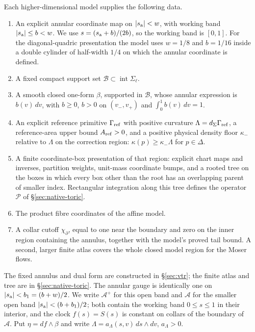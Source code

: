 \begin{definition}\label{def:hdl-handle-data}
Each higher-dimensional model supplies the following data.
\begin{enumerate}[label=(\alph*)]
\item An explicit annular coordinate map on $|s_{\rm a}|<w$, with working band
$|s_{\rm a}|\le b<w$. We use $s=(s_{\rm a}+b)/(2b)$, so the working band is $[0,1]$.
For the diagonal-quadric presentation the model uses $w=1/8$ and $b=1/16$ inside a double cylinder of half-width $1/4$ on which the annular coordinate is defined.
\item A fixed compact support set $\mathcal B\subset\operatorname{int}\Sigma_\ell$.
\item A smooth closed one-form $\beta$, supported in $\mathcal B$, whose annular expression is
$b(v)\,dv$, with $b\ge0$, $b>0$ on $(v_-,v_+)$ and $\int_0^1b(v)\,dv=1$.
\item An explicit reference primitive $\Gamma_{\rm ref}$ with positive curvature
$\Lambda=d_\Sigma\Gamma_{\rm ref}$, a reference-area upper bound $A_{\rm ref}>0$, and a positive
physical density floor $\kappa_-$ relative to $\Lambda$ on the correction region:
$\kappa(p)\ge\kappa_-\Lambda$ for $p\in\Delta$.
\item A finite coordinate-box presentation of that region: explicit chart maps and inverses,
partition weights, unit-mass coordinate bumps, and a rooted tree on the boxes in which every box other than the root has an overlapping parent of smaller index.
Rectangular integration along this tree defines the operator $\mathcal P$ of \S\ref{sec:native-toric}.
\item The product fibre coordinates of the affine model.
\item A collar cutoff $\chi_\partial$, equal to one near the boundary and zero on the inner region
containing the annulus, together with the model's proved tail bound. A second, larger finite atlas
covers the whole closed model region for the Moser flows.
\end{enumerate}
\end{definition}

The fixed annulus and dual form are constructed in \S\ref{sec:vtr}; the finite atlas and tree are in
\S\ref{sec:native-toric}. The annular gauge is identically one on $|s_{\rm a}|<b_1=(b+w)/2$.
We write $\mathcal A^+$ for this open band and $\mathcal A$ for the smaller open band
$|s_{\rm a}|<(b+b_1)/2$; both contain the working band $0\le s\le1$ in their interior, and the clock $f(s)=S(s)$ is
constant on collars of the boundary of $\mathcal A$. Put $\eta=df\wedge\beta$ and write
$\Lambda=a_\Lambda(s,v)\,ds\wedge dv$, $a_\Lambda>0$.

